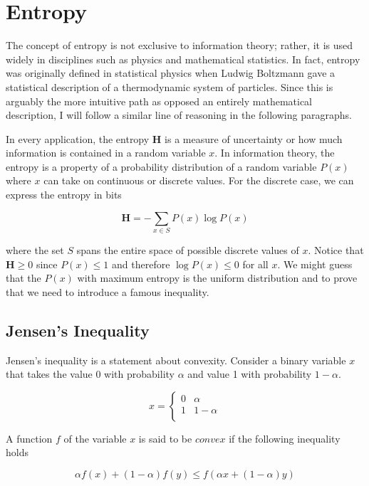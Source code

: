 \documentclass[a4paper,11pt]{book}
\begin{document}
\section{Entropy}

The concept of entropy is not exclusive to information theory; rather, it is used widely in disciplines such as physics and mathematical statistics. In fact, entropy was originally defined in statistical physics when Ludwig Boltzmann gave a statistical description of a thermodynamic system of particles. Since this is arguably the more intuitive path as opposed an entirely mathematical description, I will follow a similar line of reasoning in the following paragraphs.

In every application, the entropy $\mathbf{H}$ is a measure of uncertainty or how much information is contained in a random variable $x$. In information theory, the entropy is a property of a probability distribution of a random variable $P(x)$ where $x$ can take on continuous or discrete values. For the discrete case, we can express the entropy in bits 

\begin{equation}
\textbf{H} = -\sum_{x\in S} P(x)\log P(x)
\end{equation}

where the set $S$ spans the entire space of possible discrete values of $x$. Notice that $\mathbf{H} \geq 0$ since $P(x) \leq 1$ and therefore $\log P(x) \leq 0$  for all $x$. We might guess that the $P(x)$ with maximum entropy is the uniform distribution and to prove that we need to introduce a famous inequality.

\subsection{Jensen's Inequality}

Jensen's inequality is a statement about convexity. Consider a binary variable $x$ that takes the value 0 with probability $\alpha$ and value 1 with probability $1-\alpha$.

\[x= \begin{cases} 
      0 & \alpha \\
      1 & 1-\alpha \\
   \end{cases}
\]

A function $f$ of the variable $x$ is said to be $\textit{convex}$ if the following inequality holds

\begin{equation*}
\alpha f(x) + (1-\alpha)f(y) \leq f(\alpha x + (1-\alpha)y)
\end{equation*}
\end{document}
